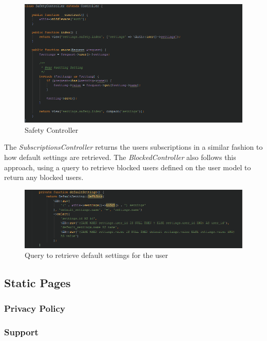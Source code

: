 \begin{figure}[H]
\centering
\includegraphics[width=\textwidth]{Images/Implementation/SafetyController}
\caption{Safety Controller}
\label{fig:SafetyController}
\end{figure}

The \textit{SubscriptionsController} returns the users subscriptions in a similar fashion to how default settings are retrieved. The \textit{BlockedController} also follows this approach, using a query to retrieve blocked users defined on the user model to return any blocked users.

\begin{figure}[H]
\centering
\includegraphics[width=\textwidth]{Images/Implementation/UserDefaultSettings}
\caption{Query to retrieve default settings for the user}
\label{fig:UserDefaultSettings}
\end{figure}

\subsection{Static Pages}
\subsubsection{Privacy Policy}
\subsubsection{Support}

